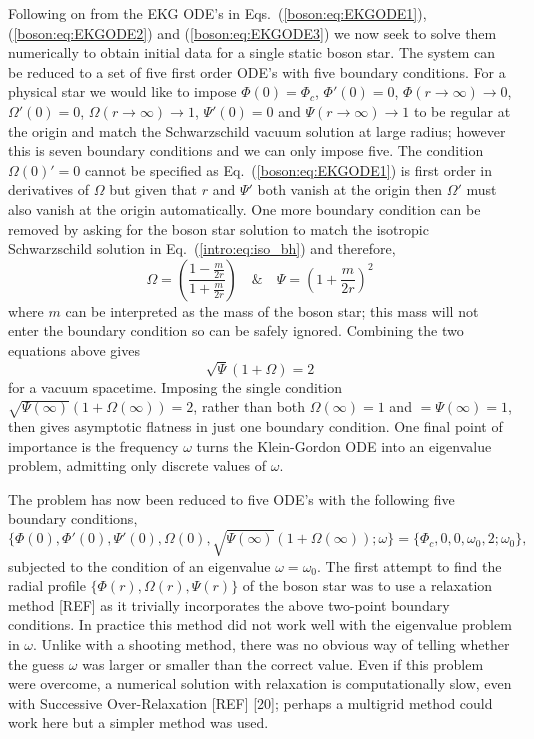 Following on from the EKG ODE's in Eqs.~(\ref{boson:eq:EKGODE1}),  (\ref{boson:eq:EKGODE2}) and (\ref{boson:eq:EKGODE3}) we now seek to solve them numerically to obtain initial data for a single static boson star. The system can be reduced to a set of five first order ODE's with five boundary conditions. For a physical star we would like to impose $\Phi(0) = \Phi_c$, $\Phi'(0)=0$, $\Phi(r\rightarrow\infty)\rightarrow0$, $\Omega'(0)=0$, $\Omega(r\rightarrow\infty)\rightarrow1$, $\Psi'(0)=0$ and $\Psi(r\rightarrow\infty)\rightarrow1$ to be regular at the origin and match the Schwarzschild vacuum solution at large radius; however this is seven boundary conditions and we can only impose five. The condition $\Omega(0)'=0$ cannot be specified as Eq.~(\ref{boson:eq:EKGODE1}) is first order in derivatives of $\Omega$ but given that $r$ and $\Psi'$ both vanish at the origin then $\Omega'$ must also vanish at the origin automatically. One more boundary condition can be removed by asking for the boson star solution to match the isotropic Schwarzschild solution in Eq.~(\ref{intro:eq:iso_bh}) and therefore,
\begin{equation}
\Omega = \left(\frac{1-\frac{m}{2r}}{1+\frac{m}{2r}}\right) \quad \& \quad \Psi = \left( 1+\frac{m}{2r}\right)^2 \end{equation} 
where $m$ can be interpreted as the mass of the boson star; this mass will not enter the boundary condition so can be safely ignored. Combining the two equations above gives
\begin{equation} 
\sqrt{\Psi}\left(1+\Omega\right) = 2
\end{equation}
for a vacuum spacetime. Imposing the single condition $\sqrt{\Psi(\infty)}\left(1+\Omega(\infty)\right)=2$, rather than both $\Omega(\infty)=1$ and $=\Psi(\infty)=1$, then gives asymptotic flatness in just one boundary condition. One final point of importance is the frequency $\omega$ turns the Klein-Gordon ODE into an eigenvalue problem, admitting only discrete values of $\omega$. 

The problem has now been reduced to five ODE's with the following five boundary conditions,
\begin{equation} \{\Phi(0),\Phi'(0),\Psi'(0),\Omega(0),\sqrt{\Psi(\infty)}\left(1+\Omega(\infty)\right);\omega \} = \{ \Phi_c,0,0,\omega_0,2;\omega_0\},\end{equation}
subjected to the condition of an eigenvalue $\omega=\omega_0$. The first attempt to find the radial profile $\{\Phi(r), \Omega(r), \Psi(r)\}$ of the boson star was to use a relaxation 
method [REF] as it trivially incorporates the above two-point boundary conditions. In practice this method did not work well with the eigenvalue problem in $\omega$.
Unlike with a shooting method, there was no obvious way of telling whether the guess $\omega$ was larger or
smaller than the correct value. Even if this problem were overcome, a numerical solution with relaxation is computationally slow, even with Successive Over-Relaxation [REF] [20]; perhaps a multigrid method could work here but a simpler method was used.


